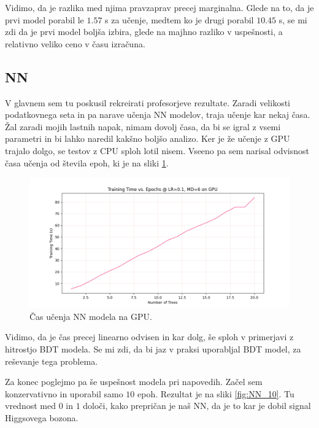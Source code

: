 \documentclass[a4paper]{article}
\begin{document}
Vidimo, da je razlika med njima pravzaprav precej marginalna. Glede na to, da je prvi model porabil le $1.57$ s za učenje,
medtem ko je drugi porabil $10.45$ s, se mi zdi da je prvi model boljša izbira, glede na majhno razliko v uspešnosti, a relativno 
veliko ceno v času izračuna.
\subsection{NN}
V glavnem sem tu poskusil rekreirati profesorjeve rezultate. Zaradi velikosti podatkovnega seta in pa narave 
učenja NN modelov, traja učenje kar nekaj časa. Žal zaradi mojih lastnih napak, nimam dovolj časa, da bi se 
igral z vsemi parametri in bi lahko naredil kakšno boljšo analizo. Ker je že učenje z GPU trajalo dolgo, 
se testov z CPU sploh lotil nisem. Vseeno pa sem narisal odvisnost časa učenja od števila epoh, ki je na sliki
\ref{fig:NN_times}. \\

\begin{figure}[H]
    \centering
    \includegraphics[width=1\textwidth]{../images/NNraw_performance.png}
    \caption{Čas učenja NN modela na GPU.}
    \label{fig:NN_times}
\end{figure}

Vidimo, da je čas precej linearno odvisen in kar dolg, še sploh v primerjavi z hitrostjo BDT modela. Se mi zdi,
da bi jaz v praksi uporabljal BDT model, za reševanje tega problema.

Za konec poglejmo pa še uspešnost modela pri napovedih. Začel sem konzervativno in uporabil samo $10$ epoh. Rezultat je 
na sliki \ref{fig:NN_10}. Tu vrednost med $0$ in $1$ določi, kako prepričan je naš NN, da je to kar je dobil signal 
Higgsovega bozona.
\end{document}
